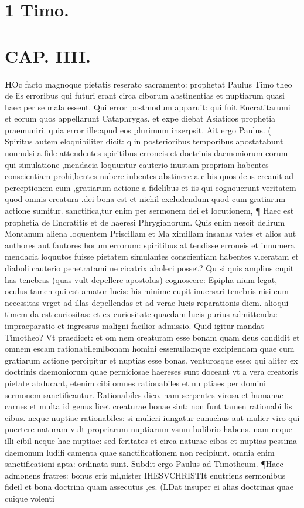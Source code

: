 \documentclass{article}
\begin{document}
\begin{pages}
\section*{1 Timo. }
\marginpar{[ p.207 ]}
\endnumbering\beginnumbering\section{CAP. IIII.}\pstart \huge\textbf{H}\normalsize Oc facto magnoque pietatis reserato sacramento: prophetat Paulus Timo theo de iis erroribus qui futuri erant circa ciborum abstinentias et nuptiarum quasi haec per se mala essent. Qui error postmodum apparuit: qui fuit Encratitarumi et eorum quos appellarunt Cataphrygas. et expe diebat Asiaticos prophetia praemuniri. quia error ille:apud eos plurimum inserpsit. Ait ergo Paulus. ( Spiritus autem eloquibiliter dicit: q in posterioribus temporibus apostatabunt nonnulsi a fide attendentes spiritibus erroneis et doctrinis daemoniorum eorum qui simulatione ,mendacia loquuntur cauterio inustam propriam habentes conscientiam prohi,bentes nubere iubentes abstinere a cibis quos deus creauit ad perceptionem cum ,gratiarum actione a fidelibus et iis qui cognouerunt veritatem quod omnis creatura .dei bona est et nichil excludendum quod cum gratiarum actione sumitur. sanctifica,tur enim per sermonem dei et locutionem, ¶ Haec est prophetia de Encratitis et de haeresi Phrygianorum. Quis enim nescit delirum Montanum aliena loquentem Priscillam et Ma ximillam insanas vates et alios aut authores aut fautores horum errorum: spiritibus at tendisse erroneis et innumera mendacia loquutos fuisse pietatem simulantes conscientiam habentes vlceratam et diaboli cauterio penetratami ne cicatrix aboleri posset? Qu si quis amplius cupit has tenebras (quas vult depellere apostolus) cognoscere: Epipha nium legat, oculus tamen qui est amator lucis: his minime cupit inuersari tenebris nisi cum necessitas vrget ad illas depellendas et ad verae lucis reparationis diem. alioqui timem da est curiositas: et ex curiositate quaedam lucis purius admittendae impraeparatio et ingressus maligni facilior admissio. Quid igitur mandat Timotheo? Vt praedicet: et om nem creaturam esse bonam quam deus condidit et omnem escam rationabilemlbonam homini essenullamque excipiendam quae cum gratiarum actione percipitur et nuptias esse bonas. venturosque esse: qui aliter ex doctrinis daemoniorum quae perniciosae haereses sunt doceant vt a vera creatoris pietate abducant, etenim cibi omnes rationabiles et nu ptiaes per domini sermonem sanctificantur. Rationabiles dico. nam serpentes virosa et humanae carnes et multa id genus licet creaturae bonae sint: non funt tamen rationabi lis cibus. neque nuptiae rationabiles: si mulieri iungatur eunuchus aut mulier viro qui puertere naturam vult propriarum nuptiarum vsum ludibrio habens. nam neque illi cibil neque hae nuptiae: sed feritates et circa naturae cibos et nuptias pessima daemonum ludifi camenta quae sanctificationem non recipiunt. omnia enim sanctificationi apta: ordinata sunt. Subdit ergo Paulus ad Timotheum. ¶Haec admonens fratres: bonus eris mi,nister IHESVCHRISTIt enutriens sermonibus fideil et bona doctrina quam assecutus ,es. (LDat insuper ei alias doctrinas quae cuique volenti 
\end{pages}
\end{document}
